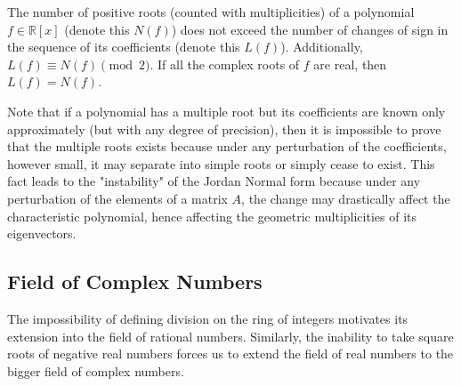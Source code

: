     \begin{theorem}
      The number of positive roots (counted with multiplicities) of a polynomial $f \in \mathbb{R}[x]$ (denote this $N(f)$) does not exceed the number of changes of sign in the sequence of its coefficients (denote this $L(f)$). Additionally, $L(f) \equiv N(f) \pmod{2}$. If all the complex roots of $f$ are real, then $L(f) = N(f)$. 
    \end{theorem}

    Note that if a polynomial has a multiple root but its coefficients are known only approximately (but with any degree of precision), then it is impossible to prove that the multiple roots exists because under any perturbation of the coefficients, however small, it may separate into simple roots or simply cease to exist. This fact leads to the "instability" of the Jordan Normal form because under any perturbation of the elements of a matrix $A$, the change may drastically affect the characteristic polynomial, hence affecting the geometric multiplicities of its eigenvectors. 

\subsection{Field of Complex Numbers}

  The impossibility of defining division on the ring of integers motivates its extension into the field of rational numbers. Similarly, the inability to take square roots of negative real numbers forces us to extend the field of real numbers to the bigger field of complex numbers. 


